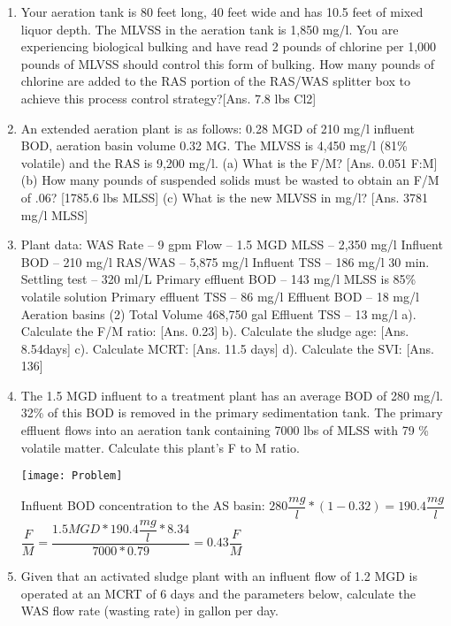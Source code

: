 \begin{enumerate}
\item Your aeration tank is 80 feet long, 40 feet wide and has 10.5 feet of mixed liquor depth.  The MLVSS in the aeration tank is 1,850 mg/l. You are experiencing biological bulking and have read 2 pounds of chlorine per 1,000 pounds of MLVSS should control this form of bulking. How many pounds of chlorine are added to the RAS portion of the RAS/WAS splitter box to achieve this process control strategy?[Ans. 7.8 lbs Cl2]

\item An extended aeration plant is as follows: 0.28 MGD of 210 mg/l influent BOD, aeration basin volume 0.32 MG.  The MLVSS is 4,450 mg/l (81\% volatile) and the RAS is  9,200 mg/l.  (a) What is the F/M?  [Ans. 0.051 F:M] (b) How many pounds of suspended solids must be wasted to obtain an F/M of .06? [1785.6 lbs MLSS] (c) What is the new MLVSS in mg/l? [Ans. 3781 mg/l MLSS]

\item Plant data:      WAS Rate – 9 gpm Flow – 1.5 MGD MLSS – 2,350 mg/l Influent BOD – 210 mg/l RAS/WAS – 5,875 mg/l Influent TSS – 186 mg/l 30 min. Settling test – 320 ml/L Primary effluent BOD – 143 mg/l MLSS is 85\% volatile solution Primary effluent TSS – 86 mg/l Effluent BOD – 18 mg/l Aeration basins (2) Total Volume 468,750 gal Effluent TSS – 13 mg/l a). Calculate the F/M ratio: [Ans. 0.23] b). Calculate the sludge age: [Ans. 8.54days] c). Calculate MCRT: [Ans. 11.5 days] d). Calculate the SVI: [Ans. 136]

\item The 1.5 MGD influent to a treatment plant has an average BOD of 280 mg/l.  32\% of this BOD is removed in the primary sedimentation tank. The primary effluent flows into an aeration tank containing 7000 lbs of MLSS with 79 \% volatile matter.  Calculate this plant's F to M ratio.

\begin{center}
\texttt{[image: Problem]}
\end{center}

Influent BOD concentration to the AS basin: $280\dfrac{mg}{l}*(1-0.32)= 190.4 \dfrac{mg}{l}$\\

$\dfrac{F}{M}= \dfrac{1.5 MGD * 190.4\dfrac{mg}{l}*8.34}{7000*0.79}= \boxed{0.43\dfrac{F}{M}}$
\\

\item Given that an activated sludge plant with an influent flow of 1.2 MGD is operated at an MCRT of 6 days and the parameters below, calculate the WAS flow rate (wasting rate) in gallon per day.
\\


\end{enumerate}
